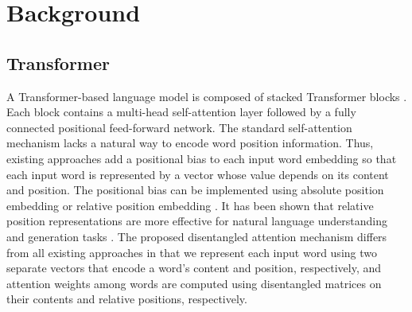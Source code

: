 \section{Background}
\subsection{Transformer}
A Transformer-based language model is composed of %
stacked Transformer blocks \citep{vaswani2017attention}.
Each block contains a multi-head self-attention layer followed by a fully connected positional feed-forward network. 
The standard self-attention mechanism lacks a natural way to encode word position information.  
Thus, existing approaches add  a positional bias to each input word embedding so that each input word is represented by a vector whose value depends on its content and position.
The positional bias can be implemented using absolute position embedding \citep{vaswani2017attention,radford2019language,devlin2018bert} or relative position embedding \citep{huang2018music,yang2019xlnet}.
It has been shown that relative position representations are more effective for natural language understanding and generation tasks \citep{dai2019transformer,shaw2018self}.
The proposed disentangled attention mechanism differs from all existing approaches in that we represent each input word using two separate vectors that encode a word's content and position, respectively, and attention weights among words are computed using disentangled matrices on their contents and relative positions, respectively. 


